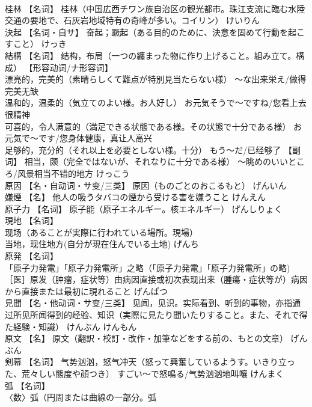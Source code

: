\documentclass[8pt]{extreport}
\begin{document}
\begin{CJK}{UTF8}{min}
\\	桂林	【名词】 桂林（中国広西チワン族自治区の観光都市。珠江支流に臨む水陸交通の要地で、石灰岩地域特有の奇峰が多い。コイリン）	けいりん	
\\	決起	【名词・自サ】 奋起；蹶起（ある目的のために、決意を固めて行動を起こすこと）	けっき	
\\	結構	【名词】 结构，布局（一つの纏まった物に作り上げること。組み立て。構成） 【形容动词/ナ形容词】 
\\	漂亮的，完美的（素晴らしくて難点が特別見当たらない様） ～な出来栄え/做得完美无缺 
\\	温和的，温柔的（気立てのよい様。お人好し） お元気そうで～ですね/您看上去很精神 
\\	可喜的，令人满意的（満足できる状態である様。その状態で十分である様） お元気で～です/您身体健康，真让人高兴 
\\	足够的，充分的（それ以上を必要としない様。十分） もう～だ/已经够了 【副词】 相当，颇（完全ではないが、それなりに十分である様） ～眺めのいいところ/风景相当不错的地方	けっこう	
\\	原因	【名・自动词・サ变/三类】 原因（ものごとのおこるもと）	げんいん	
\\	嫌煙	【名】 他人の吸うタバコの煙から受ける害を嫌うこと	けんえん	
\\	原子力	【名词】 原子能（原子エネルギー。核エネルギー）	げんしりょく	
\\	現地	【名词】 
\\	现场（あることが実際に行われている場所。現場） 
\\	当地，现住地方(自分が現在住んでいる土地)	げんち	
\\	原発	【名词】 
\\	「原子力発電」「原子力発電所」之略（「原子力発電」「原子力発電所」の略) 
\\	［医］原发（肿瘤，症状等）由病因直接或初次表现出来（腫瘍・症状等が）病因から直接または最初に現れること	げんぱつ	
\\	見聞	【名・他动词・サ变/三类】 见闻，见识。实际看到、听到的事物，亦指通过所见所闻得到的经验、知识（実際に見たり聞いたりすること。また、それで得た経験・知識）	けんぶん けんもん	
\\	原文	【名】 原文（翻訳・校訂・改作・加筆などをする前の、もとの文章）	げんぶん	
\\	剣幕	【名词】 气势汹汹，怒气冲天（怒って興奮しているようす。いきり立った、荒々しい態度や顔つき） すごい～で怒鳴る/气势汹汹地叫嚷	けんまく	
\\	弧	【名词】 
\\	〈数〉弧（円周または曲線の一部分。弧

\end{CJK}
\end{document}
